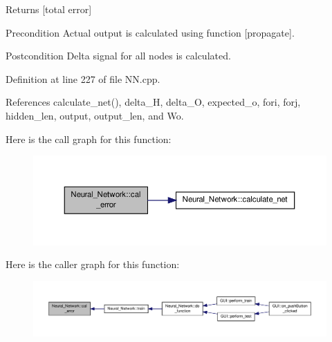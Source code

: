 \begin{DoxyReturn}{Returns}
\mbox{[}total error\mbox{]} 
\end{DoxyReturn}
\begin{DoxyPrecond}{Precondition}
Actual output is calculated using function \mbox{[}propagate\mbox{]}. 
\end{DoxyPrecond}
\begin{DoxyPostcond}{Postcondition}
Delta signal for all nodes is calculated. 
\end{DoxyPostcond}


Definition at line 227 of file N\-N.\-cpp.



References calculate\-\_\-net(), delta\-\_\-\-H, delta\-\_\-\-O, expected\-\_\-o, fori, forj, hidden\-\_\-len, output, output\-\_\-len, and Wo.



Here is the call graph for this function\-:\nopagebreak
\begin{figure}[H]
\begin{center}
\leavevmode
\includegraphics[width=350pt]{d1/d7c/a00003_a3e503ddab5bbc51f6e0b79b67ca6ed2f_cgraph}
\end{center}
\end{figure}




Here is the caller graph for this function\-:\nopagebreak
\begin{figure}[H]
\begin{center}
\leavevmode
\includegraphics[width=350pt]{d1/d7c/a00003_a3e503ddab5bbc51f6e0b79b67ca6ed2f_icgraph}
\end{center}
\end{figure}


